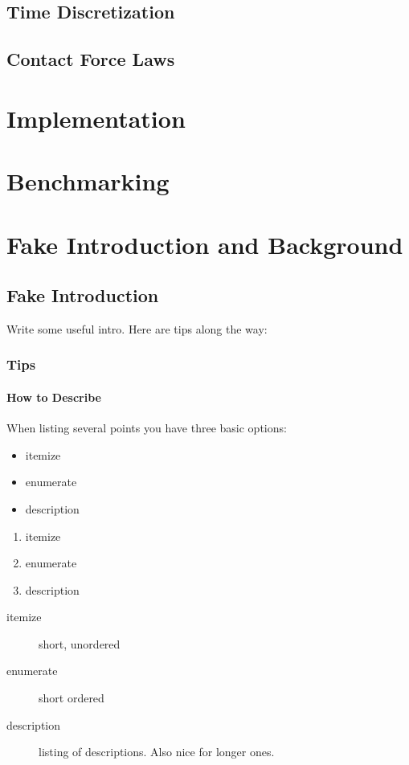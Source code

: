 \documentclass[11pt,
               a4paper,
               bibtotoc,
               idxtotoc,
               headsepline,
               footsepline,
               footexclude,
               BCOR12mm,
               DIV13,
               openany,   %
               ]
               {scrbook}
\begin{document}
\chapter{Time Discretization}
\chapter{Contact Force Laws}

\part{Implementation}

\part{Benchmarking}

\part{Fake Introduction and Background}
\chapter{Fake Introduction}
\label{sec:intro}       %
Write some useful intro. Here are tips along the way:

\section{Tips}
\subsection{How to Describe}
\setlength{\columnsep}{30 pt}
When listing several points you have three basic options:
\begin{multicols}{3}
    \begin{itemize}
        \item itemize
        \item enumerate
        \item description
    \end{itemize}

    \vfill\null
    \columnbreak

    \begin{enumerate}
        \item itemize
        \item enumerate
        \item description
    \end{enumerate}

    \vfill\null
    \columnbreak

    \begin{description}
        \item[itemize] short, unordered
        \item[enumerate] short ordered
        \item[description] listing of descriptions. Also nice for longer ones.
    \end{description}

\end{multicols}
\end{document}
